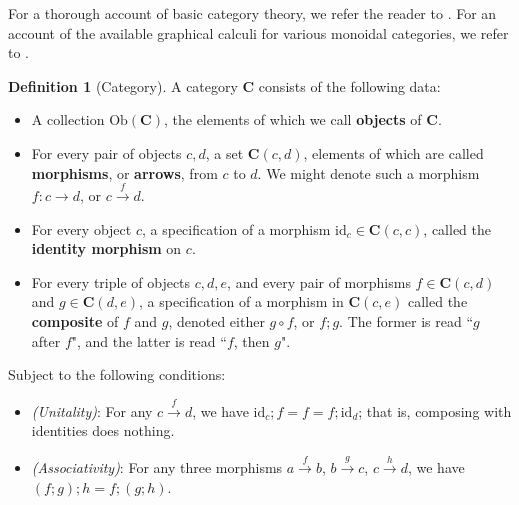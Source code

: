 \documentclass[11pt]{article}
\newcommand{\cat}{\mathbf}
\newcommand{\id}[1]{\textrm{id}_{#1}}
\newcommand{\ob}[1]{\textrm{Ob}(#1)}
\theoremstyle{definition}
\newtheorem{defn}{Definition}
\theoremstyle{plain}
\begin{document}
For a thorough account of basic category theory, we refer the reader to \cite{abramsky_introduction_2010}. For an account of the available graphical calculi for various monoidal categories, we refer to \cite{selinger_survey_2010}.

\begin{defn}[Category]
A category $\cat{C}$ consists of the following data:
\begin{itemize}
\item{A collection $\ob{\cat{C}}$, the elements of which we call \textbf{objects} of $\cat{C}$.} 
\item{For every pair of objects $c,d$, a set $\cat{C}(c,d)$, elements of which are called \textbf{morphisms}, or \textbf{arrows}, from $c$ to $d$. We might denote such a morphism $f: c \rightarrow d$, or $c \overset{f}{\rightarrow} d$.
}
\item{For every object $c$, a specification of a morphism $\id{c} \in \cat{C}(c,c)$, called the \textbf{identity morphism} on $c$.
}
\item{For every triple of objects $c,d,e$, and every pair of morphisms $f \in \cat{C}(c,d)$ and $g \in \cat{C}(d,e)$, a specification of a morphism in $\cat{C}(c,e)$ called the \textbf{composite} of $f$ and $g$, denoted either $g \circ f$, or $f ; g$. The former is read ``$g$ after $f$", and the latter is read ``$f$, then $g$".
}
\end{itemize}
Subject to the following conditions:
\begin{itemize}
\item{\emph{(Unitality)}: For any $c\overset{f}{\rightarrow}d$, we have $\id{c} ; f = f = f; \id{d}$; that is, composing with identities does nothing.
}
\item{\emph{(Associativity)}: For any three morphisms $a \overset{f}{\rightarrow}b$, $b \overset{g}{\rightarrow} c$, $c \overset{h}{\rightarrow}d$, we have $(f;g);h = f;(g;h)$.}
\end{itemize}
\end{defn}
\end{document}
